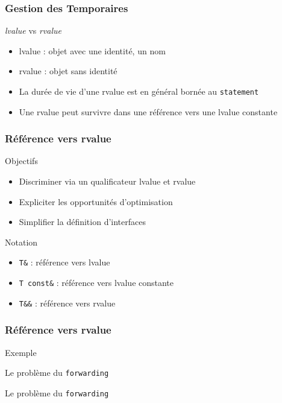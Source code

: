 \documentclass[svgnames]{beamer}
\begin{document}
\frame
{
  \frametitle{Gestion des Temporaires}
  \begin{block}{\textit{lvalue} vs \textit{rvalue}}
  \begin{itemize}
  \item lvalue : objet avec une identit\'e, un nom
  \item rvalue : objet sans identit\'e
  \item La durée de vie d'une rvalue est en général bornée au \texttt{statement}
  \item Une rvalue peut survivre dans une référence vers une lvalue constante
  \end{itemize}
  \end{block}

}

\frame
{
  \frametitle{R\'ef\'erence vers rvalue}
  \begin{block}{Objectifs}
  \begin{itemize}
  \item Discriminer via un qualificateur lvalue et rvalue
  \item Expliciter les opportunit\'es d'optimisation
  \item Simplifier la d\'efinition d'interfaces
  \end{itemize}
  \end{block}

  \begin{block}{Notation}
  \begin{itemize}
  \item \texttt{T\&} : référence vers lvalue
  \item \texttt{T const\&} : référence vers lvalue constante
  \item \texttt{T\&\&} : référence vers rvalue
  \end{itemize}
  \end{block}
}

\frame
{
  \frametitle{R\'ef\'erence vers rvalue}
  {
    \begin{block}{Exemple}
    \end{block}
  }
  
  {
    \begin{block}{Le problème du \texttt{forwarding}}
    \end{block}
  }
  
  {
    \begin{block}{Le problème du \texttt{forwarding}}
    \end{block}
  }
}
\end{document}
